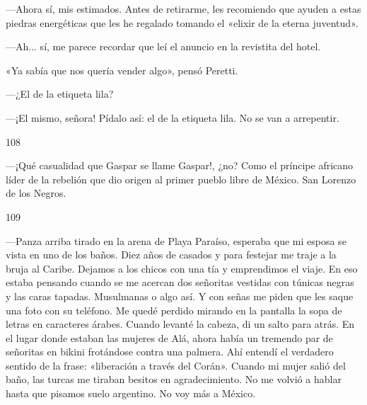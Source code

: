 \documentclass[12pt,twoside,openright,a5paper]{book}
\begin{document}
\nopagebreak

---Ahora sí, mis estimados. Antes de retirarme, les recomiendo que ayuden a
estas piedras energéticas que les he regalado tomando el «elixir de la
eterna juventud».

---Ah... sí, me parece recordar que leí el anuncio en la revistita del hotel.

«Ya sabía que nos quería vender algo», pensó Peretti.

---¿El de la etiqueta lila?

---¡El mismo, señora! Pídalo así: el de la etiqueta lila. No se van a
arrepentir.

\vspace{0.5cm}

\hrulefill \hspace{0.1cm}\decofourleft\hspace{0.2cm} 108 \hspace{0.2cm}\decofourright \hspace{0.1cm}\hrulefill

\nopagebreak

\vspace{0.5cm}

\nopagebreak

---¡Qué casualidad que Gaspar se llame Gaspar!, ¿no? Como el príncipe africano
líder de la rebelión que dio origen al primer pueblo libre de México. San
Lorenzo de los Negros.

\vspace{0.5cm}

\hrulefill \hspace{0.1cm}\decofourleft\hspace{0.2cm} 109 \hspace{0.2cm}\decofourright \hspace{0.1cm}\hrulefill

\nopagebreak

\vspace{0.5cm}

\nopagebreak

---Panza arriba tirado en la arena de Playa Paraíso, esperaba que mi esposa se
vista en uno de los baños. Diez años de casados y para festejar me traje
a la bruja al Caribe. Dejamos a los chicos con una tía y emprendimos el
viaje. En eso estaba pensando cuando se me acercan dos señoritas vestidas
con túnicas negras y las caras tapadas. Musulmanas o algo así. Y con
señas me piden que les saque una foto con su teléfono. Me quedé perdido
mirando en la pantalla la sopa de letras en caracteres árabes. Cuando levanté
la cabeza, di un salto para atrás. En el lugar donde estaban las mujeres de
Alá, ahora había un tremendo par de señoritas en bikini frotándose contra
una palmera. Ahí entendí el verdadero sentido de la frase: «liberación a
través del Corán». Cuando mi mujer salió del baño, las turcas me tiraban
besitos en agradecimiento. No me volvió a hablar hasta que pisamos suelo
argentino. No voy más a México.
\end{document}
